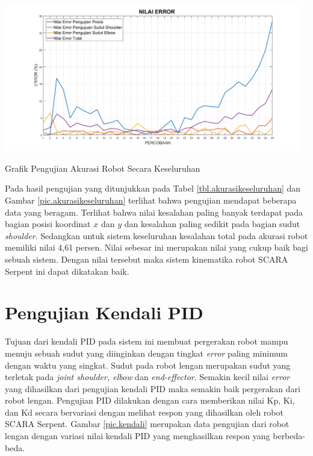 \fontsize{12}{15}\selectfont
\begin{table}[H]
	\centering
	\includegraphics[width=13cm]{gambar/ne.png}
	\caption{Grafik Pengujian Akurasi Robot Secara Keseluruhan}
	\label{pic.akurasikeseluruhan}
\end{table}


Pada hasil pengujian yang ditunjukkan pada Tabel \ref{tbl.akurasikeseluruhan} dan Gambar \ref{pic.akurasikeseluruhan} terlihat bahwa pengujian mendapat beberapa data yang beragam. Terlihat bahwa nilai kesalahan paling banyak terdapat pada bagian posisi koordinat $x$ dan $y$ dan kesalahan paling sedikit pada bagian sudut \textit{shoulder}. Sedangkan untuk sistem keseluruhan kesalahan total pada akurasi robot memiliki nilai 4,61 persen. Nilai sebesar ini merupakan nilai yang cukup baik bagi sebuah sistem. Dengan nilai tersebut maka sistem kinematika robot SCARA Serpent ini dapat dikatakan baik. 


\section{Pengujian Kendali PID}
Tujuan dari kendali PID pada sistem ini membuat pergerakan robot mampu menuju sebuah sudut yang diinginkan dengan tingkat \textit{error} paling minimum dengan waktu yang singkat. Sudut pada robot lengan merupakan sudut yang terletak pada \textit{joint shoulder, elbow} dan \textit{end-effector}. Semakin kecil nilai \textit{error} yang dihasilkan dari pengujian kendali PID maka semakin baik pergerakan dari robot lengan. Pengujian PID dilakukan dengan cara memberikan nilai Kp, Ki, dan Kd secara bervariasi dengan melihat respon yang dihasilkan oleh robot SCARA Serpent. Gambar \ref{pic.kendali} merupakan data pengujian dari robot lengan dengan variasi nilai kendali PID yang menghasilkan respon yang berbeda-beda.


